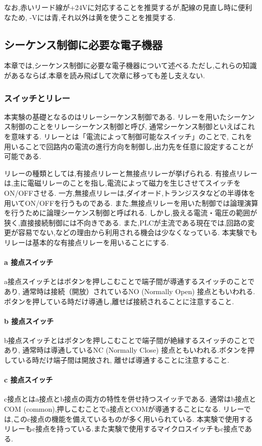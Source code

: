 なお,赤いリード線が+24Vに対応することを推奨するが,配線の見直し時に便利なため,
-Vには青,それ以外は黄を使うことを推奨する.

\subsection{シーケンス制御に必要な電子機器}

本章では,シーケンス制御に必要な電子機器について述べる.ただし,これらの知識があるならば,本章を読み飛ばして次章に移っても差し支えない.

\subsubsection{スイッチとリレー}
本実験の基礎となるのはリレーシーケンス制御である.
リレーを用いたシーケンス制御のことをリレーシーケンス制御と呼び,
通常シーケンス制御といえばこれを意味する.
リレーとは「電流によって制御可能なスイッチ」のことで,
これを用いることで回路内の電流の進行方向を制御し,出力先を任意に設定することが可能である.

リレーの種類としては,有接点リレーと無接点リレーが挙げられる.
有接点リレーは,主に電磁リレーのことを指し,電流によって磁力を生じさせてスイッチをON/OFFさせる.
一方,無接点リレーは,ダイオード,トランジスタなどの半導体を用いてON/OFFを行うものである.
また,無接点リレーを用いた制御では論理演算を行うために論理シーケンス制御と呼ばれる.
しかし,扱える電流・電圧の範囲が狭く,直接接続制御には不向きである.
また,PLCが主流である現在では,回路の変更が容易でない,などの理由から利用される機会は少なくなっている.
本実験でもリレーは基本的な有接点リレーを用いることにする.

\paragraph{a 接点スイッチ}
a接点スイッチとはボタンを押しこむことで端子間が導通するスイッチのことであり,
通常時は接続（開放）されているNO (Normally Open) 接点ともいわれる.
ボタンを押している時だけ導通し,離せば接続されることに注意すること.

\paragraph{b 接点スイッチ}
b接点スイッチとはボタンを押しこむことで端子間が絶縁するスイッチのことであり,
通常時は導通しているNC (Normally Close) 接点ともいわれる.ボタンを押している時だけ端子間は開放され,
離せば導通することに注意すること.

\paragraph{c 接点スイッチ}
c接点とはa接点とb接点の両方の特性を併せ持つスイッチである.
通常はb接点とCOM (common),押しこむことでa接点とCOMが導通することになる.
リレーでは,このc接点の機能を備えているものが多く用いられている.
本実験で使用するリレーもc接点を持っている.また実験で使用するマイクロスイッチもc接点である.

